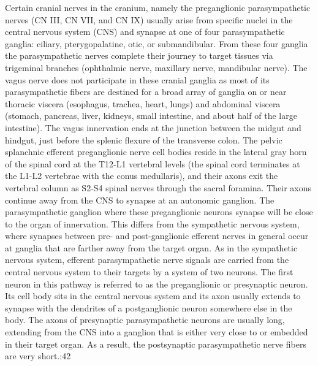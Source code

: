 \documentclass[]{book}
\begin{document}
Certain cranial nerves in the cranium, namely the preganglionic parasympathetic nerves (CN III, CN VII, and CN IX) usually arise from specific nuclei in the central nervous system (CNS) and synapse at one of four parasympathetic ganglia: ciliary, pterygopalatine, otic, or submandibular. From these four ganglia the parasympathetic nerves complete their journey to target tissues via trigeminal branches (ophthalmic nerve, maxillary nerve, mandibular nerve).
The vagus nerve does not participate in these cranial ganglia as most of its parasympathetic fibers are destined for a broad array of ganglia on or near thoracic viscera (esophagus, trachea, heart, lungs) and abdominal viscera (stomach, pancreas, liver, kidneys, small intestine, and about half of the large intestine). The vagus innervation ends at the junction between the midgut and hindgut, just before the splenic flexure of the transverse colon.
The pelvic splanchnic efferent preganglionic nerve cell bodies reside in the lateral gray horn of the spinal cord at the T12-L1 vertebral levels (the spinal cord terminates at the L1-L2 vertebrae with the conus medullaris), and their axons exit the vertebral column as S2-S4 spinal nerves through the sacral foramina. Their axons continue away from the CNS to synapse at an autonomic ganglion. The parasympathetic ganglion where these preganglionic neurons synapse will be close to the organ of innervation. This differs from the sympathetic nervous system, where synapses between pre- and post-ganglionic efferent nerves in general occur at ganglia that are farther away from the target organ.
As in the sympathetic nervous system, efferent parasympathetic nerve signals are carried from the central nervous system to their targets by a system of two neurons. The first neuron in this pathway is referred to as the preganglionic or presynaptic neuron. Its cell body sits in the central nervous system and its axon usually extends to synapse with the dendrites of a postganglionic neuron somewhere else in the body. The axons of presynaptic parasympathetic neurons are usually long, extending from the CNS into a ganglion that is either very close to or embedded in their target organ. As a result, the postsynaptic parasympathetic nerve fibers are very short.:42
\end{document}
